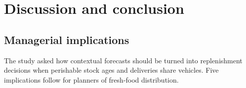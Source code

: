 \section{Discussion and conclusion}\label{sec:conclusion}

\subsection{Managerial implications}

The study asked how contextual forecasts should be turned into replenishment decisions when perishable stock ages and deliveries share vehicles. Five implications follow for planners of fresh-food distribution.

